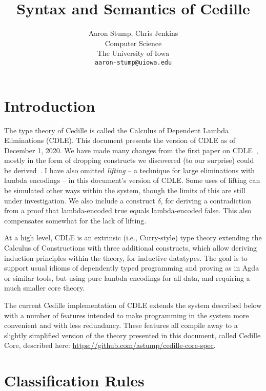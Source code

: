 \documentclass{article}
\begin{document}
\title{Syntax and Semantics of Cedille}

\author{Aaron Stump, Chris Jenkins \\
  Computer Science \\
  The University of Iowa \\
\texttt{aaron-stump@uiowa.edu}}

\date{}

\maketitle

\section{Introduction}

The type theory of Cedille is called the Calculus of Dependent Lambda
Eliminations (CDLE).  This document presents the version of CDLE as of
December 1, 2020.  We have made many changes from the first paper on CDLE~\cite{stump17},
mostly in the form of dropping constructs we discovered (to our
surprise) could be derived~\cite{stump18}. I have also omitted
\emph{lifting} -- a technique for large eliminations with lambda
encodings -- in this document's version of CDLE.  Some uses of lifting
can be simulated other ways within the system, though the limits of
this are still under investigation.  We also include a construct
$\delta$, for deriving a contradiction from a proof that
lambda-encoded true equals lambda-encoded false.  This also
compensates somewhat for the lack of lifting.

At a high level, CDLE is an extrinsic (i.e., Curry-style) type theory
extending the Calculus of Constructions with three additional
constructs, which allow deriving induction principles within the
theory, for inductive datatypes.  The goal is to support usual
idioms of dependently typed programming and proving as in Agda or
similar tools, but using pure lambda encodings for all data, and
requiring a much smaller core theory.

The current Cedille implementation of CDLE extends the system
described below with a number of features intended to make programming
in the system more convenient and with less redundancy.  These
features all compile away to a slightly simplified version of the
theory presented in this document, called Cedille Core, described
here: \url{https://github.com/astump/cedille-core-spec}.

\section{Classification Rules}
\end{document}
